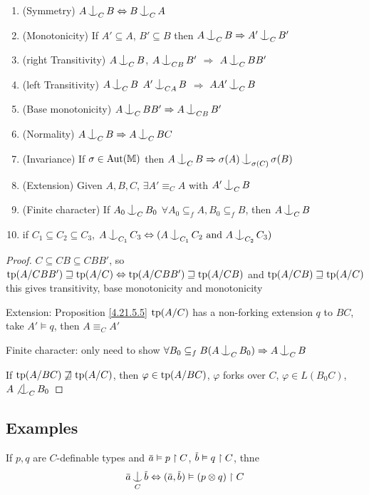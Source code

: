 \documentclass[11pt]{article}
\begin{document}
\begin{proposition}[]
\label{4.28.10.6}
\begin{enumerate}
\item (Symmetry) \(A\ind_CB\Leftrightarrow B\ind_CA\)
\item (Monotonicity) If \(A'\subseteq A\), \(B'\subseteq B\) then \(A\ind_CB\Rightarrow A'\ind_CB'\)
\item (right Transitivity) \(A\ind_CB\), \(A\ind_{CB}B'\) \(\Rightarrow\) \(A\ind_CBB'\)
\item (left Transitivity) \(A\ind_CB\) \(A'\ind_{CA}B\) \(\Rightarrow\) \(AA'\ind_CB\)
\item (Base monotonicity) \(A\ind_C BB'\Rightarrow A\ind_{CB}B'\)
\item (Normality) \(A\ind_CB\Rightarrow A\ind_CBC\)
\item (Invariance) If \(\sigma\in\operatorname{\text{Aut}}(\mathbb{M})\) then \(A\ind_CB\Rightarrow\sigma(A)\ind_{\sigma(C)}\sigma(B)\)
\item (Extension) Given \(A,B,C\), \(\exists A'\equiv_CA\) with \(A'\ind_CB\)
\item (Finite character) If \(A_0\ind_CB_0\) \(\forall A_0\subseteq_fA,B_0\subseteq_fB\), then \(A\ind_CB\)
\item if \(C_1\subseteq C_2\subseteq C_3\), \(A\ind_{C_1}C_3\Leftrightarrow(A\ind_{C_1}C_2\text{ and }A\ind_{C_2}C_3)\)
\end{enumerate}
\end{proposition}

\begin{proof}
\(C\subseteq CB\subseteq CBB'\), so \(\operatorname{tp}(A/CBB')\sqsupseteq\operatorname{tp}(A/C)\Leftrightarrow\operatorname{tp}(A/CBB')\sqsupseteq\operatorname{tp}(A/CB)\) and
\(\operatorname{tp}(A/CB)\sqsupseteq\operatorname{tp}(A/C)\)
this gives transitivity, base monotonicity and monotonicity

Extension: Proposition \ref{4.21.5.5} \(\operatorname{tp}(A/C)\) has a non-forking extension \(q\) to \(BC\),
take \(A'\vDash q\), then \(A\equiv_CA'\)

Finite character: only need to show \(\forall B_0\subseteq_fB(A\ind_CB_0)\Rightarrow A\ind_CB\)

If \(\operatorname{tp}(A/BC)\not\sqsupseteq\operatorname{tp}(A/C)\), then \(\varphi\in\operatorname{tp}(A/BC)\), \(\varphi\) forks over \(C\), \(\varphi\in L(B_0C)\), \(A\not\ind_CB_0\)
\end{proof}

\subsection{Examples}
\label{sec:org5f8679a}
\begin{proposition}[]
If \(p,q\) are \(C\)-definable types and \(\bara\vDash p\uhr C\), \(\barb\vDash q\uhr C\), thne
\begin{equation*}
\bara\ind_C\barb\Leftrightarrow(\bara,\barb)\vDash(p\otimes q)\uhr C
\end{equation*}
\end{proposition}
\end{document}
